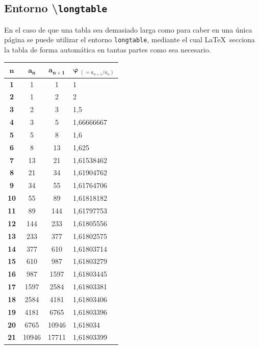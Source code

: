 \documentclass[a4paper, 11pt, spanish, twoside]{article}
\begin{document}
\newpage
\subsection{Entorno \textbackslash\texttt{longtable}}

En el caso de que una tabla sea demasiado larga como para caber en una única página se puede utilizar el entorno \texttt{longtable}, mediante el cual \LaTeX \ secciona la tabla de forma automática en tantas partes como sea necesario.

\vspace{10pt}

\begin{longtable}[H]{|c|c|c|l|}
\hline
$\bm{n}$ & $\bm{a_n}$ & $\bm{a_{n+1}}$ & $\bm{\varphi} \ _{(= a_{n+1}/a_n)}$ \\ \hline\hline
\endhead
\textbf{1} & 1 & 1 & 1 \\ \hline
\textbf{2} & 1 & 2 & 2 \\ \hline
\textbf{3} & 2 & 3 & 1,5 \\ \hline
\textbf{4} & 3 & 5 & 1,66666667 \\ \hline
\textbf{5} & 5 & 8 & 1,6 \\ \hline
\textbf{6} & 8 & 13 & 1,625 \\ \hline
\textbf{7} & 13 & 21 & 1,61538462 \\ \hline
\textbf{8} & 21 & 34 & 1,61904762 \\ \hline
\textbf{9} & 34 & 55 & 1,61764706 \\ \hline
\textbf{10} & 55 & 89 & 1,61818182 \\ \hline
\textbf{11} & 89 & 144 & 1,61797753 \\ \hline
\textbf{12} & 144 & 233 & 1,61805556 \\ \hline
\textbf{13} & 233 & 377 & 1,61802575 \\ \hline
\textbf{14} & 377 & 610 & 1,61803714 \\ \hline
\textbf{15} & 610 & 987 & 1,61803279 \\ \hline
\textbf{16} & 987 & 1597 & 1,61803445 \\ \hline
\textbf{17} & 1597 & 2584 & 1,61803381 \\ \hline
\textbf{18} & 2584 & 4181 & 1,61803406 \\ \hline
\textbf{19} & 4181 & 6765 & 1,61803396 \\ \hline
\textbf{20} & 6765 & 10946 & 1,618034 \\ \hline
\textbf{21} & 10946 & 17711 & 1,61803399 \\ \hline

\end{longtable}
\end{document}
